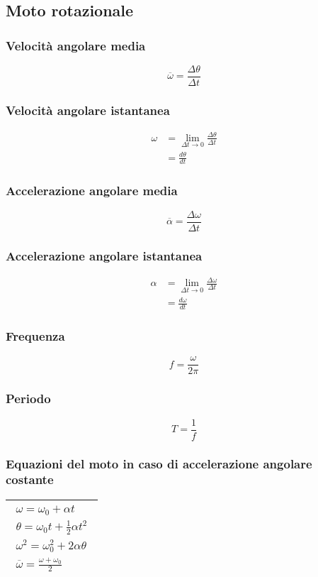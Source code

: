 \documentclass[a4paper,12pt]{article}
\theoremstyle{mystyle}
\begin{document}
\newpage

\subsection{Moto rotazionale}
\subsubsection{Velocità angolare media}
\[\overline \omega = \frac{\Delta \theta}{\Delta t}\]
\subsubsection{Velocità angolare istantanea}
\[\begin{aligned}
    \omega &= \lim_{\Delta t \rightarrow 0} \frac{\Delta \theta}{\Delta t}\\
    &= \frac{d \theta}{dt}
\end{aligned}\]
\subsubsection{Accelerazione angolare media}
\[\overline \alpha = \frac{\Delta \omega}{\Delta t}\]
\subsubsection{Accelerazione angolare istantanea}
\[\begin{aligned}
    \alpha &= \lim_{\Delta t \rightarrow 0} \frac{\Delta \omega}{\Delta t}\\
    &= \frac{d \omega}{dt}
\end{aligned}\]
\subsubsection{Frequenza}
\[f=\frac{\omega}{2\pi}\]
\subsubsection{Periodo}
\[T = \frac{1}{f}\]

\subsubsection{Equazioni del moto in caso di accelerazione angolare costante}
\begin{table}[h]
    \centering
    \begin{tabular}{|c|}
    \hline
    $\begin{array}{c}
        \omega = \omega_0 + \alpha t \\
        \theta = \omega_0 t + \frac{1}{2} \alpha t^2 \\
        \omega^2 = \omega_0^2 + 2 \alpha \theta \\
        \overline{\omega} = \frac{\omega + \omega_0}{2}
    \end{array}$\\
    \hline
    \end{tabular}
\end{table}
\end{document}

